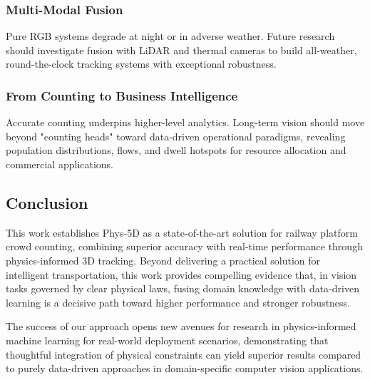 \subsubsection{Multi-Modal Fusion}
Pure RGB systems degrade at night or in adverse weather. Future research should investigate fusion with LiDAR and thermal cameras to build all-weather, round-the-clock tracking systems with exceptional robustness.

\subsubsection{From Counting to Business Intelligence}
Accurate counting underpins higher-level analytics. Long-term vision should move beyond "counting heads" toward data-driven operational paradigms, revealing population distributions, flows, and dwell hotspots for resource allocation and commercial applications.

\subsection{Conclusion}

This work establishes Phys-5D as a state-of-the-art solution for railway platform crowd counting, combining superior accuracy with real-time performance through physics-informed 3D tracking. Beyond delivering a practical solution for intelligent transportation, this work provides compelling evidence that, in vision tasks governed by clear physical laws, fusing domain knowledge with data-driven learning is a decisive path toward higher performance and stronger robustness.

The success of our approach opens new avenues for research in physics-informed machine learning for real-world deployment scenarios, demonstrating that thoughtful integration of physical constraints can yield superior results compared to purely data-driven approaches in domain-specific computer vision applications.